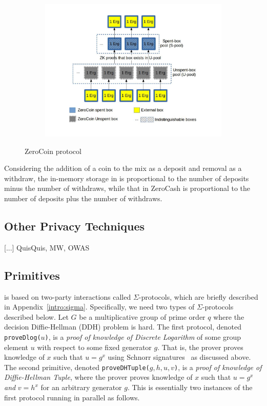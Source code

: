 \documentclass[11pt]{article}
\begin{document}
\begin{figure}
	\centering
	\begin{subfigure}{.8\textwidth}
		\centering
		\includegraphics[width=\linewidth]{ZeroCoin.jpg}
	\end{subfigure}
	\caption{ZeroCoin protocol}
	\label{fig:zerocoin}
\end{figure}

Considering the addition of a coin to the mix as a deposit and removal as a withdraw, the in-memory storage in \algname is proportional to the number of deposits minus the number of withdraws, while that in ZeroCash is proportional to the number of deposits plus the number of withdraws.  



\subsection{Other Privacy Techniques}
[...]
QuisQuis, MW, OWAS

\subsection{Primitives} 

\algname is based on two-party interactions called $\Sigma$-protocols, which are briefly described in Appendix~\ref{intro:sigma}. 
Specifically, we need two types of $\Sigma$-protocols described below. Let $G$ be a multiplicative group of prime order $q$ where the decision Diffie-Hellman (DDH) problem is hard. The first protocol, denoted \texttt{proveDlog($u$)}, is a {\em proof of knowledge of Discrete Logarithm} of some group element $u$ with respect to some fixed generator $g$. That is, the prover proves knowledge of $x$ such that $u = g^x$ using Schnorr signatures~\cite{Sch91} as discussed above. The second primitive, denoted \texttt{proveDHTuple($g, h, u, v$)}, is a {\em proof of knowledge of Diffie-Hellman Tuple}, where the prover proves knowledge of $x$ such that $u = g^x$ {\em and} $v = h^x$ for an arbitrary generator $g$. This is essentially two instances of the first protocol running in parallel as follows.
\end{document}
